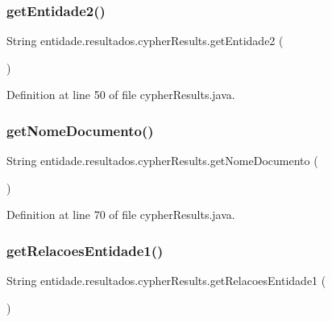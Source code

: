 \subsubsection{\texorpdfstring{get\+Entidade2()}{getEntidade2()}}
{\footnotesize\ttfamily String entidade.\+resultados.\+cypher\+Results.\+get\+Entidade2 (\begin{DoxyParamCaption}{ }\end{DoxyParamCaption})}



Definition at line 50 of file cypher\+Results.\+java.

\hypertarget{classentidade_1_1resultados_1_1cypherResults_af126305c04727e92719c7ccdc243683c}{}\label{classentidade_1_1resultados_1_1cypherResults_af126305c04727e92719c7ccdc243683c} 
\subsubsection{\texorpdfstring{get\+Nome\+Documento()}{getNomeDocumento()}}
{\footnotesize\ttfamily String entidade.\+resultados.\+cypher\+Results.\+get\+Nome\+Documento (\begin{DoxyParamCaption}{ }\end{DoxyParamCaption})}



Definition at line 70 of file cypher\+Results.\+java.

\hypertarget{classentidade_1_1resultados_1_1cypherResults_a4da90baa7d0c37931e4f7602fdf69382}{}\label{classentidade_1_1resultados_1_1cypherResults_a4da90baa7d0c37931e4f7602fdf69382} 
\subsubsection{\texorpdfstring{get\+Relacoes\+Entidade1()}{getRelacoesEntidade1()}}
{\footnotesize\ttfamily String entidade.\+resultados.\+cypher\+Results.\+get\+Relacoes\+Entidade1 (\begin{DoxyParamCaption}{ }\end{DoxyParamCaption})}



